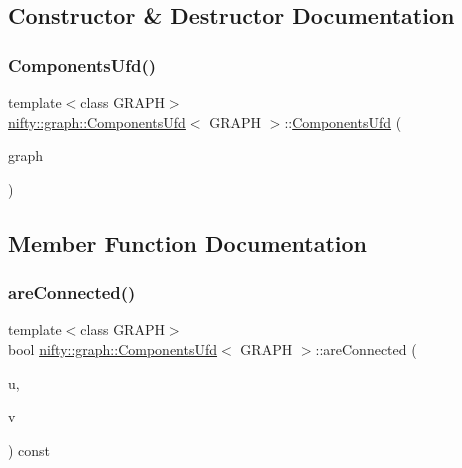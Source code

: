 \subsection{Constructor \& Destructor Documentation}
\mbox{\label{classnifty_1_1graph_1_1ComponentsUfd_a4d31de0cf2c4eb1abadf9c2611174ead}} 
\subsubsection{\texorpdfstring{Components\+Ufd()}{ComponentsUfd()}}
{\footnotesize\ttfamily template$<$class G\+R\+A\+PH$>$ \\
\hyperlink{classnifty_1_1graph_1_1ComponentsUfd}{nifty\+::graph\+::\+Components\+Ufd}$<$ G\+R\+A\+PH $>$\+::\hyperlink{classnifty_1_1graph_1_1ComponentsUfd}{Components\+Ufd} (\begin{DoxyParamCaption}\item[{const \hyperlink{classnifty_1_1graph_1_1ComponentsUfd_a022ccf51b6dd4a943d3d614b97faa783}{Graph\+Type} \&}]{graph }\end{DoxyParamCaption})\hspace{0.3cm}{\ttfamily [inline]}}



\subsection{Member Function Documentation}
\mbox{\label{classnifty_1_1graph_1_1ComponentsUfd_a37bd75263b5a1dce2d3452e5ad71062f}} 
\subsubsection{\texorpdfstring{are\+Connected()}{areConnected()}\hspace{0.1cm}{\footnotesize\ttfamily [1/2]}}
{\footnotesize\ttfamily template$<$class G\+R\+A\+PH$>$ \\
bool \hyperlink{classnifty_1_1graph_1_1ComponentsUfd}{nifty\+::graph\+::\+Components\+Ufd}$<$ G\+R\+A\+PH $>$\+::are\+Connected (\begin{DoxyParamCaption}\item[{const int64\+\_\+t}]{u,  }\item[{const int64\+\_\+t}]{v }\end{DoxyParamCaption}) const\hspace{0.3cm}{\ttfamily [inline]}}

